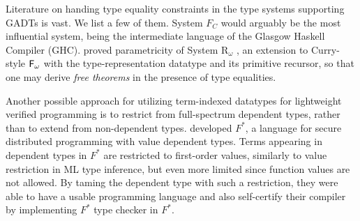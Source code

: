 Literature on handing type equality constraints in the type systems supporting
GADTs is vast. We list a few of them. System $F_{\!C}$ \cite{Sulzmann07} would
arguably be the most influential system, being the intermediate language of
the Glasgow Haskell Compiler (GHC). \citet{VytWei10} proved parametricity of
System $\mathrm{R}_\omega$ \cite{Crary98}, an extension to Curry-style $\mathsf{F}_\omega$
with the type-representation datatype and its primitive recursor, so that
one may derive \emph{free theorems} \cite{Wadler89free} in the presence of
type equalities.

Another possible approach for utilizing term-indexed datatypes for lightweight
verified programming is to restrict from full-spectrum dependent types, rather
than to extend from non-dependent types. \citet{Swamy11} developed $F^{*}$,
a language for secure distributed programming with value dependent types.
Terms appearing in dependent types in $F^{*}$ are restricted to first-order
values, similarly to value restriction in ML type inference, but even more
limited since function values are not allowed. By taming the dependent type
with such a restriction, they were able to have a usable programming language
and also self-certify \cite{Strub12} their compiler by implementing $F^{*}$
type checker in $F^{*}$.

